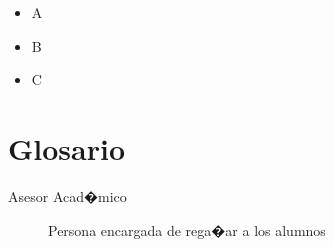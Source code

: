 \documentclass[12pt,letterpaper,spanish, xcolor=table]{report}
\begin{document}
\begin{itemize}
  \item A
  \item B
  \item C
\end{itemize}





\newpage
\chapter{Glosario}

\begin{description}
  \item[Asesor Acad�mico] Persona encargada de rega�ar a los alumnos
\end{description}

\end{document}
